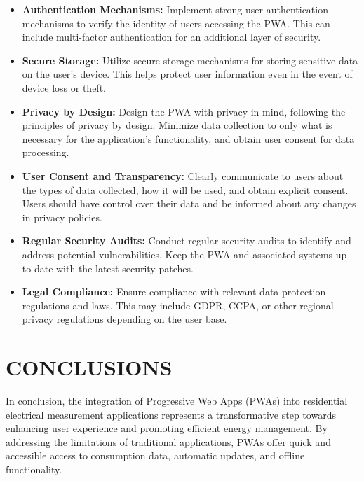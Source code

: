 \documentclass{article}
\begin{document}
\begin{multicols}{2}
\begin{itemize}
    \item \textbf{Authentication Mechanisms:} Implement strong user authentication mechanisms to verify the identity of users accessing the PWA. This can include multi-factor authentication for an additional layer of security.

    \item \textbf{Secure Storage:} Utilize secure storage mechanisms for storing sensitive data on the user's device. This helps protect user information even in the event of device loss or theft.

    \item \textbf{Privacy by Design:} Design the PWA with privacy in mind, following the principles of privacy by design. Minimize data collection to only what is necessary for the application's functionality, and obtain user consent for data processing.

    \item \textbf{User Consent and Transparency:} Clearly communicate to users about the types of data collected, how it will be used, and obtain explicit consent. Users should have control over their data and be informed about any changes in privacy policies.

    \item \textbf{Regular Security Audits:} Conduct regular security audits to identify and address potential vulnerabilities. Keep the PWA and associated systems up-to-date with the latest security patches.

    \item \textbf{Legal Compliance:} Ensure compliance with relevant data protection regulations and laws. This may include GDPR, CCPA, or other regional privacy regulations depending on the user base.
    
    \citep{Security}
\end{itemize}

\section*{CONCLUSIONS}
In conclusion, the integration of Progressive Web Apps (PWAs) into residential electrical measurement applications represents a transformative step towards enhancing user experience and promoting efficient energy management. By addressing the limitations of traditional applications, PWAs offer quick and accessible access to consumption data, automatic updates, and offline functionality.




\end{multicols}
\end{document}
